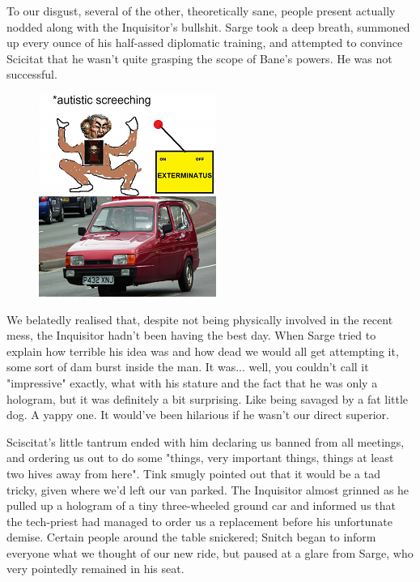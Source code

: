 To our disgust, several of the other, theoretically sane, people present actually nodded along with the Inquisitor's bullshit. 
 Sarge took a deep breath, summoned up every ounce of his half-assed diplomatic training, and attempted to convince Scicitat that he wasn't quite grasping the scope of Bane's powers. 
He was not successful.

\begin{figure}
	\begin{center}
		\includegraphics[width=\figwidth]{pics/19/14.png}
	\end{center}
\end{figure}
We belatedly realised that, despite not being physically involved in the recent mess, the Inquisitor hadn't been having the best day. 
When Sarge tried to explain how terrible his idea was and how dead we would all get attempting it, some sort of dam burst inside the man. 
It was... 
well, you couldn't call it "impressive" exactly, what with his stature and the fact that he was only a hologram, but it was definitely a bit surprising. 
Like being savaged by a fat little dog. 
A yappy one. 
It would've been hilarious if he wasn't our direct superior.

Sciscitat's little tantrum ended with him declaring us banned from all meetings, and ordering us out to do some "things, very important things, things at least two hives away from here". 
Tink smugly pointed out that it would be a tad tricky, given where we'd left our van parked. 
The Inquisitor almost grinned as he pulled up a hologram of a tiny three-wheeled ground car and informed us that the tech-priest had managed to order us a replacement before his unfortunate demise. 
Certain people around the table snickered; 
Snitch began to inform everyone what we thought of our new ride, but paused at a glare from Sarge, who very pointedly remained in his seat.

